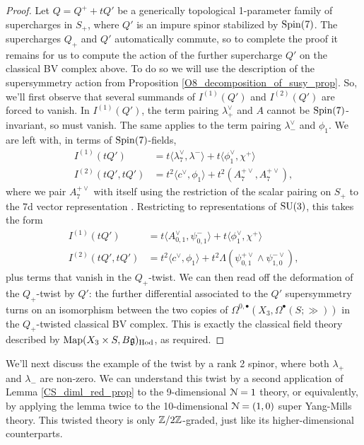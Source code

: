 \documentclass[10pt, oneside]{article}
\begin{document}
\begin{proof}
Let $Q = Q^+ + tQ'$ be a generically topological 1-parameter family of supercharges in $S_+$, where $Q'$ is an impure spinor stabilized by $\mathrm{Spin}(7)$.  The supercharges $Q_+$ and $Q'$ automatically commute, so to complete the proof it remains for us to compute the action of the further supercharge $Q'$ on the classical BV complex above.  To do so we will use the description of the supersymmetry action from Proposition \ref{O8_decomposition_of_susy_prop}.  So, we'll first observe that several summands of $I^{(1)}(Q')$ and $I^{(2)}(Q')$ are forced to vanish.  In $I^{(1)}(Q')$, the term pairing $\lambda_+^\vee$ and $A$ cannot be $\mathrm{Spin}(7)$-invariant, so must vanish.  The same applies to the term pairing $\lambda_-^\vee$ and $\phi_1$. We are left with, in terms of $\mathrm{Spin}(7)$-fields,
\begin{align*}
I^{(1)}(tQ') &= t\langle\lambda_7^\vee, \lambda^-\rangle + t\langle \phi_1^\vee, \chi^+\rangle \\
I^{(2)}(tQ', tQ') &= t^2\langle c^\vee, \phi_1\rangle + t^2 (A_7^{+\vee} , A_7^{+\vee}),
\end{align*}
where we pair $A_7^{+\vee}$ with itself using the restriction of the scalar pairing on $S_+$ to the 7d vector representation .  Restricting to representations of $\mathrm{SU}(3)$, this takes the form
\begin{align*}
I^{(1)}(tQ') &= t\langle A_{0,1}^\vee, \psi_{0,1}^-\rangle + t\langle \phi_1^\vee, \chi^+\rangle \\
I^{(2)}(tQ', tQ') &= t^2\langle c^\vee, \phi_1\rangle + t^2 \Lambda(\psi_{0,1}^{+\vee} \wedge \psi_{1,0}^{-\vee}),
\end{align*}
plus terms that vanish in the $Q_+$-twist.  We can then read off the deformation of the $Q_+$-twist by $Q'$: the further differential associated to the $Q'$ supersymmetry turns on an isomorphism between the two copies of $\Omega^{0,\bullet}(X_3, \Omega^\bullet(S;\gg))$ in the $Q_+$-twisted classical BV complex.  This is exactly the classical field theory described by $\operatorname{Map}(X_3 \times S, B\mathfrak{g})_{\mathrm{Hod}}$, as required.
\end{proof}

We'll next discuss the example of the twist by a rank 2 spinor, where both $\lambda_+$ and $\lambda_-$ are non-zero.  We can understand this twist by a second application of Lemma \ref{CS_diml_red_prop} to the 9-dimensional $\mathcal{N}=1$ theory, or equivalently, by applying the lemma twice to the 10-dimensional $\mathcal{N}=(1,0)$ super Yang-Mills theory.  This twisted theory is only $\mathbb Z/2\mathbb Z$-graded, just like its higher-dimensional counterparts.
\end{document}
